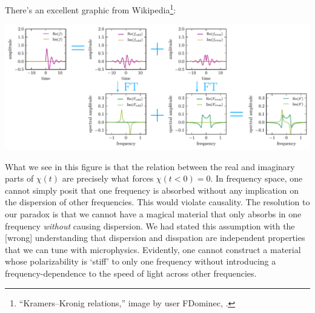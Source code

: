 There's an excellent graphic from Wikipedia\footnote{``Kramers--Kronig relations,'' image by user FDominec, .}:
\begin{center}
\includegraphics[width=.9\textwidth]{figures/Kramers_05_Fdominec.pdf}
\end{center}
What we see in this figure is that the relation between the real and imaginary parts of $\chi(t)$ are precisely what forces $\chi(t<0) = 0$. In frequency space, one cannot simply posit that one frequency is absorbed without any implication on the dispersion of other frequencies. This would violate causality. The resolution to our paradox is that we cannot have a magical material that only absorbs in one frequency \emph{without} causing dispersion. We had stated this assumption with the [wrong] understanding that dispersion and disspation are independent properties that we can tune with microphysics. Evidently, one cannot construct a material whose polarizability is `stiff' to only one frequency without introducing a frequency-dependence to the speed of light across other frequencies.





